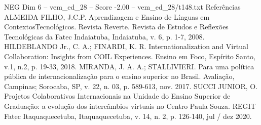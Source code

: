 \begin{textsample}{NEG Dim 6 – vem\_ed\_28 – Score -2.00 – vem\_ed\_28/t148.txt}
Referências ALMEIDA FILHO, J.C.P.
Aprendizagem e Ensino de Línguas em ContextosTecnológicos.
Revista Reverte.
Revista de Estudos e Reflexões Tecnológicas da Fatec Indaiatuba, Indaiatuba, v. 6, p. 1-7, 2008.
HILDEBLANDO Jr., C.
A.; FINARDI, K.
R.
Internationalization and Virtual Collaboration: Insights from COIL Experiences.
Ensino em Foco, Espírito Santo, v.1, n.2, p. 19-33, 2018.
MIRANDA, J.
A.
A.; STALLIVIERI.
Para uma política pública de internacionalização para o ensino superior no Brasil.
Avaliação, Campinas; Sorocaba, SP, v. 22, n. 03, p. 589-613, nov. 2017.
SUCCI JUNIOR, O.
Projetos Colaborativos Internacionais na Unidade do Ensino Superior de Graduação: a evolução dos intercâmbios virtuais no Centro Paula Souza.
REGIT Fatec Itaquaquecetuba, Itaquaquecetuba, v. 14, n. 2, p. 126-140, jul / dez 2020.

\end{textsample}
